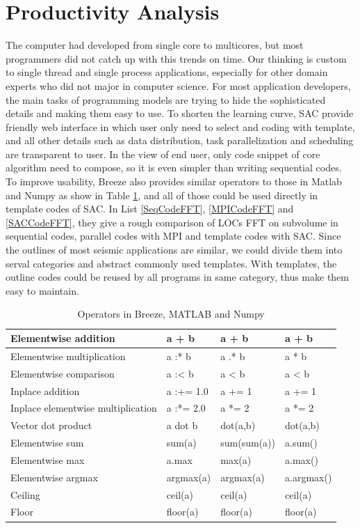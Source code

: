 \section{Productivity Analysis}
The computer had developed from single core to multicores, but most programmers did not catch up with this trends on time. Our thinking is custom to single thread and single process applications, especially for other domain experts who did not major in computer science. For most application developers, the main tasks of programming models are trying to hide the sophisticated details and making them easy to use. To shorten the learning curve, SAC provide friendly web interface in which user only need to select and coding with template, and all other details such as data distribution, task parallelization and scheduling are transparent to user. In the view of end user, only code snippet of core algorithm need to compose, so it is even simpler than writing sequential codes. To improve usability, Breeze also provides similar operators to those in Matlab and Numpy as show in Table \ref{tab:BreezeOperators}, and all of those could be used directly in template codes of SAC. In List \ref{SeqCodeFFT}, \ref{MPICodeFFT} and \ref{SACCodeFFT}, they give a rough comparison of LOCs FFT on subvolume in sequential codes, parallel codes with MPI and template codes with SAC. Since the outlines of most seismic applications are similar, we could divide them into serval categories and abstract commonly used templates. With templates, the outline codes could be reused by all programs in same category, thus make them easy to maintain.   


\begin{table}[h]
\centering
\caption{Operators in Breeze, MATLAB and Numpy}
\begin{tabular}{||l|l|l|l||}
\hline
Elementwise addition & a + b & a + b & a + b \\
\hline
Elementwise multiplication & a :* b & a .* b & a * b \\
\hline
Elementwise comparison & a :\textless{}  b & a \textless{}  b & a \textless{}  b \\
\hline
Inplace addition & a :+= 1.0 & a += 1 & a += 1 \\
\hline
Inplace elementwise multiplication & a :*= 2.0 & a *= 2 & a *= 2 \\
\hline
Vector dot product & a dot b & dot(a,b)	& dot(a,b) \\
\hline
Elementwise sum	& sum(a) & sum(sum(a)) & a.sum() \\
\hline
Elementwise max & a.max & max(a) & a.max() \\
\hline
Elementwise argmax & argmax(a) & argmax(a) & a.argmax() \\
\hline
Ceiling	& ceil(a) & ceil(a) & ceil(a) \\
\hline
Floor	& floor(a) & floor(a) & floor(a) \\
\hline
\end{tabular}
\label{tab:BreezeOperators}
\end{table}

